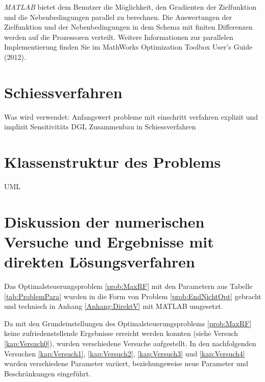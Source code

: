 \textit{MATLAB} bietet dem Benutzer die Möglichkeit, den Gradienten der Zielfunktion und die Nebenbedingungen parallel zu berechnen. Die Auswertungen der Zielfunktion und der Nebenbedingungen in dem Schema mit finiten Differenzen werden auf die Prozessoren verteilt. Weitere Informationen zur parallelen Implementierung finden Sie im MathWorks Optimization Toolbox User's Guide (2012).













\section{Schiessverfahren}

Was wird verwendet:
Anfangswert probleme mit einschritt verfahren explizit und implizit
Sensitivitäts DGL
Zusammenbau in Schiessverfahren
















\section{Klassenstruktur des Problems}

UML















\section{Diskussion der numerischen Versuche und Ergebnisse mit direkten Lösungsverfahren}
Das Optimalsteuerungsproblem \ref{prob:MaxRF} mit den Parametern aus Tabelle \ref{tab:ProblemPara} wurden in die Form von Problem \ref{prob:EndNichtOpt} gebracht und technisch in Anhang \ref{Anhang:DirektV} mit MATLAB umgesetzt. 

Da mit den Grundeinstellungen des Optimalsteuerungsproblems \ref{prob:MaxRF} keine zufriedenstellende Ergebnisse erreicht werden konnten (siehe Versuch \ref{kap:Versuch0}), wurden verschiedene Versuche aufgestellt. In den nachfolgenden Versuchen \ref{kap:Versuch1}, \ref{kap:Versuch2}, \ref{kap:Versuch3} und \ref{kap:Versuch4} wurden verschiedene Parameter variiert, beziehungsweise neue Parameter und Beschränkungen eingeführt.

